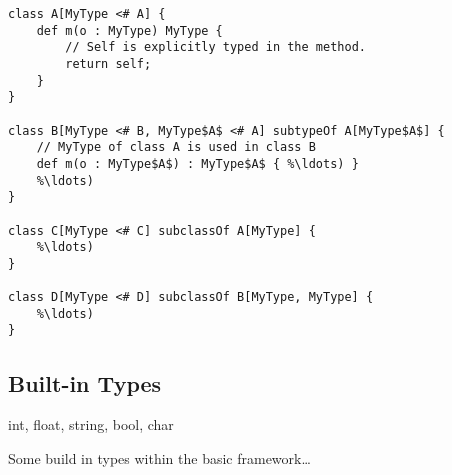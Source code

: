 \begin{lstlisting}[float,language=ooplss,caption=Explicit \mytype,label=lst:explicitMyType]
class A[MyType <# A] {
	def m(o : MyType) MyType {
		// Self is explicitly typed in the method.
		return self;
	}
}

class B[MyType <# B, MyType$A$ <# A] subtypeOf A[MyType$A$] {
	// MyType of class A is used in class B
	def m(o : MyType$A$) : MyType$A$ { %\ldots) }
	%\ldots)
}

class C[MyType <# C] subclassOf A[MyType] {
	%\ldots)
}

class D[MyType <# D] subclassOf B[MyType, MyType] {
	%\ldots)
}
\end{lstlisting}




\subsection{Built-in Types}


int, float, string, bool, char


Some build in types within the basic framework\ldots

